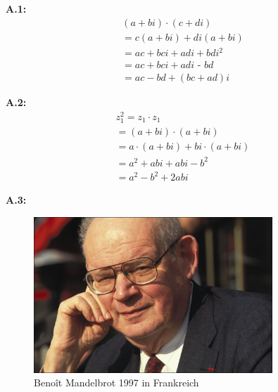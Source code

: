 \renewcommand{\theequation}{A.\arabic{equation}}
\renewcommand{\thefigure}{A.\arabic{figure}}

\noindent\textbf{A.1:}\label{app:1}
\begin{equation}\label{eq:complex-numbers-multiplication}
  \begin{split}
    (a + bi) \cdot (c + di) \\
    =  c(a + bi) + di(a + bi) \\
    = ac +bci + adi + bdi^2 \\
    = ac + bci + adi \textbf{ - } bd \\
    = ac - bd +(bc + ad)i
  \end{split}
\end{equation}

\noindent\textbf{A.2:}\label{app:2}
\begin{equation}\label{eq:complex-numbes-squaring}
  \begin{split}
    z_1^2
    = z_1 \cdot z_1 \\
    = (a + bi) \cdot (a + bi) \\
    = a \cdot (a + bi) + bi \cdot (a + bi) \\
    = a^2 + abi + abi - b^2 \\
    = a^2 - b^2 + 2abi
  \end{split}
\end{equation}

\noindent\textbf{A.3:}\label{app:3}
\begin{figure}[H]\label{fig:benoit-mandelbrot-picture}
\begin{center}
  \includegraphics[width=0.8\textwidth]{images/benoit-mandelbrot}
  \caption{Benoît Mandelbrot 1997 in Frankreich~\cite{gaillarde_benoit_1997}}
\end{center}
\end{figure}

